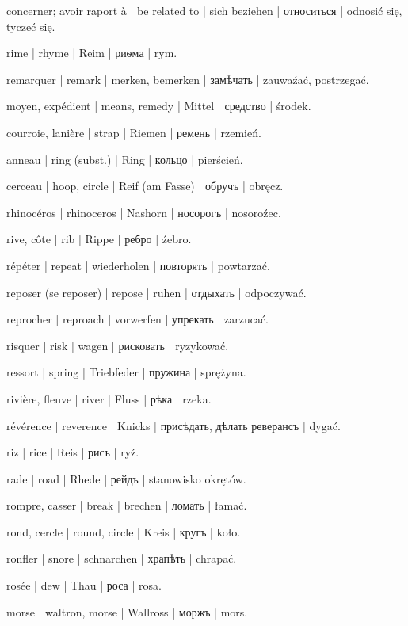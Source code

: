 \begin{outdent}{1em}
concerner; avoir raport à | be related to | sich beziehen | относиться | odnosić się, tyczeć się.

rime | rhyme | Reim | риѳма | rym.

remarquer | remark | merken, bemerken | замѣчать | zauwaźać,
postrzegać.

moyen, expédient | means, remedy | Mittel | средство | środek.

courroie, lanière | strap | Riemen | ремень | rzemień.

anneau | ring (subst.) | Ring | кольцо | pierścień.

\uvsubentry{}
cerceau | hoop, circle | Reif (am Fasse) | обручъ | obręcz.

rhinocéros | rhinoceros | Nashorn | носорогъ | nosoroźec.

rive, côte | rib | Rippe | ребро | źebro.

répéter | repeat | wiederholen | повторять | powtarzać.

reposer (se reposer) | repose | ruhen | отдыхать | odpoczywać.

reprocher | reproach | vorwerfen | упрекать | zarzucać.

risquer | risk | wagen | рисковать | ryzykować.

ressort | spring | Triebfeder | пружина | sprężyna.

rivière, fleuve | river | Fluss | рѣка | rzeka.

révérence | reverence | Knicks | присѣдать, дѣлать реверансъ | dygać.

riz | rice | Reis | рисъ | ryź.

rade | road | Rhede | рейдъ | stanowisko okrętów.

rompre, casser | break | brechen | ломать | łamać.

rond, cercle | round, circle | Kreis | кругъ | koło.

ronfler | snore | schnarchen | храпѣть | chrapać.

rosée | dew | Thau | роса | rosa.

morse | waltron, morse | Wallross | моржъ | mors.


\end{outdent}
